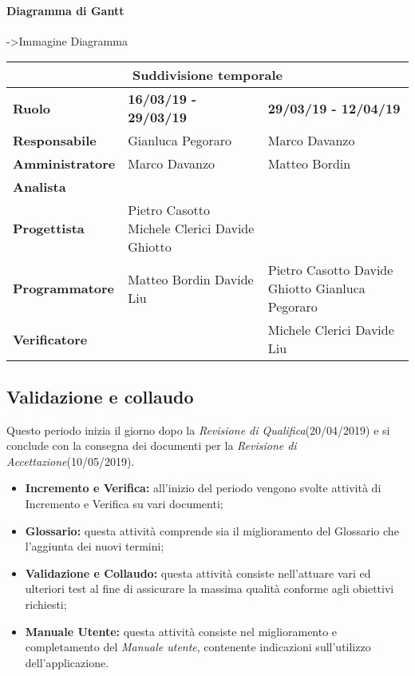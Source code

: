 	\paragraph{Diagramma di Gantt}
	->Immagine Diagramma
	
	\begin{tabular}{|l|l|l|}
		\hline
		\multicolumn{3}{|c|}{\textbf{Suddivisione temporale}}\\
		\hline
		\textbf{Ruolo} & \textbf{16/03/19 - 29/03/19} & \textbf{29/03/19 - 12/04/19} \\
		\hline
		\textbf{Responsabile} & Gianluca Pegoraro & Marco Davanzo \\
		\hline
		\textbf{Amministratore} & Marco Davanzo & Matteo Bordin  \\
		\hline
		\textbf{Analista} & &  \\
		\hline
		\textbf{Progettista} & Pietro Casotto Michele Clerici Davide Ghiotto &  \\
		\hline
		\textbf{Programmatore} & Matteo Bordin Davide Liu & Pietro Casotto Davide Ghiotto Gianluca Pegoraro \\
		\hline
		\textbf{Verificatore} &  & Michele Clerici Davide Liu \\
		\hline
	\end{tabular}
	
	\subsection{Validazione e collaudo}
	Questo periodo inizia il giorno dopo la  \textit{Revisione di Qualifica}(20/04/2019) e si conclude con la consegna dei documenti per la  \textit{Revisione di Accettazione}(10/05/2019). 
	\begin{itemize}
		\item{\textbf{Incremento e Verifica:} all’inizio del periodo vengono svolte attività di Incremento e Verifica su vari documenti;}
		\item{\textbf{Glossario:} questa attività comprende sia il miglioramento del Glossario che l’aggiunta dei nuovi termini;}
		\item{\textbf{Validazione e Collaudo:} questa attività consiste nell'attuare vari ed ulteriori test al fine di assicurare la massima qualità conforme agli obiettivi richiesti;}
		\item{\textbf{Manuale Utente:} questa attività consiste nel miglioramento e completamento del \textit{Manuale utente}, contenente indicazioni sull’utilizzo dell’applicazione.}
	\end{itemize}

